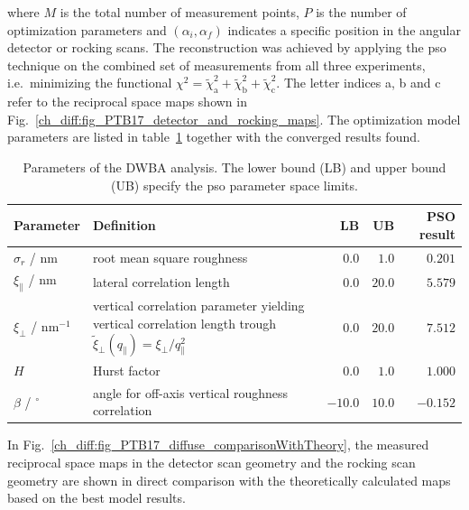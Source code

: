 where $M$ is the total number of measurement points, $P$ is the number of optimization parameters and $(\alpha_i, \alpha_f)$ indicates a specific position in the angular detector or rocking scans. The reconstruction was achieved by applying the \gls{pso} technique on the combined set of measurements from all three experiments, i.e.~minimizing the functional $\chi^2 = \tilde{\chi}^2_\text{a} + \tilde{\chi}^2_\text{b} + \tilde{\chi}^2_\text{c}$. The letter indices a, b and c refer to the reciprocal space maps shown in Fig.~\ref{ch_diff:fig_PTB17_detector_and_rocking_maps}. The optimization model parameters are listed in table~\ref{ch_diff:tbl_PTB17_diffuse_optimization_limits_and_results} together with the converged results found.
\begin{table}
\centering
\caption{Parameters of the DWBA analysis. The lower bound (LB) and upper bound (UB) specify the \gls{pso} parameter space limits.}
\label{ch_diff:tbl_PTB17_diffuse_optimization_limits_and_results}
\begin{tabularx}{\textwidth}{@{}lXrrr@{}}
\toprule
Parameter & Definition & LB & UB & PSO result\\ \midrule
$\sigma_r$ / nm & root mean square roughness & $0.0$& $1.0$ & $0.201$\\ 
$\xi_\parallel$ / nm & lateral correlation length & $0.0$& $20.0$ & $5.579$\\ 
$\xi_\perp$ / nm$^{-1}$ &vertical correlation parameter yielding vertical correlation length trough $\tilde{\xi}_\perp(q_\parallel) = \xi_\perp/q_\parallel^2$ &$0.0$ & $20.0$ & $7.512$\\
$H$ & Hurst factor & $0.0$ & $1.0$ & $1.000$ \\
$\beta$ / $^\circ$&angle for off-axis vertical roughness correlation& $-10.0$ & $10.0$ & $-0.152$\\ 
 \bottomrule
\end{tabularx}
\end{table}
In Fig.~\ref{ch_diff:fig_PTB17_diffuse_comparisonWithTheory}, the measured reciprocal space maps in the detector scan geometry and the rocking scan geometry are shown in direct comparison with the theoretically calculated maps based on the best model results. 
